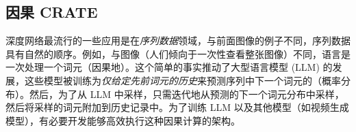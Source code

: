 \documentclass[../../book-main_zh.tex]{subfiles}
\begin{document}
\begin{table}
    \centering
    \caption{\small ToST 的长上下文性能。 我们在 Long Range Arena（一个针对长上下文任务的基准测试）上展示了其性能。在此基准测试中，与包括 Transformer 本身在内的每一种 Transformer 变体相比，ToST 都展现出了绝对领先的性能和效率。}
    \label{tab:tost_lra}
\end{table}

\subsection{因果 CRATE}
\label{sec:causal-crate}
深度网络最流行的一些应用是在\textit{序列数据}领域，与前面图像的例子不同，序列数据具有自然的顺序。例如，与图像（人们倾向于一次性查看整张图像）不同，语言是一次处理一个词元（因果地）。这个简单的事实推动了大型语言模型 (LLM) 的发展，这些模型被训练为\textit{仅给定先前词元的历史}来预测序列中下一个词元的（概率分布）。然后，为了从 LLM 中采样，只需迭代地从预测的下一个词元分布中采样，然后将采样的词元附加到历史记录中。为了训练 LLM 以及其他模型（如视频生成模型），有必要开发能够高效执行这种因果计算的架构。
\end{document}
